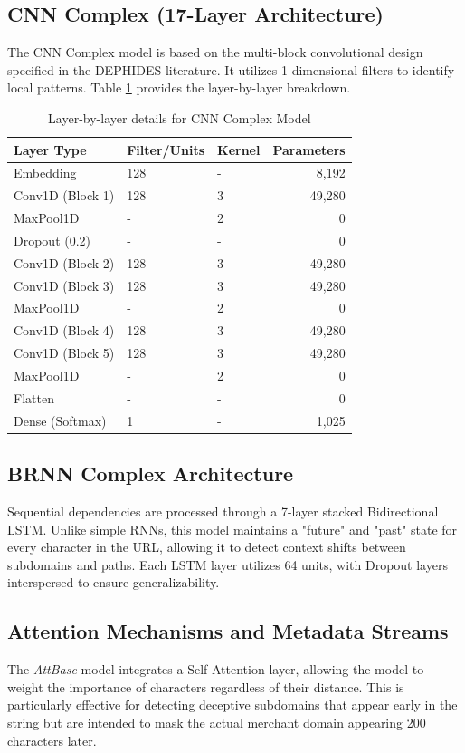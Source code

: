 \documentclass[journal,twocolumn]{IEEEtran}
\begin{document}
\subsection{CNN Complex (17-Layer Architecture)}
The CNN Complex model is based on the multi-block convolutional design specified in the DEPHIDES literature. It utilizes 1-dimensional filters to identify local patterns. Table \ref{tab:cnn_arch} provides the layer-by-layer breakdown.

\begin{table}[ht]
    \caption{Layer-by-layer details for CNN Complex Model}
    \label{tab:cnn_arch}
    \centering
    \begin{tabular}{l l l r}
    \toprule
    \textbf{Layer Type} & \textbf{Filter/Units} & \textbf{Kernel} & \textbf{Parameters} \\
    \midrule
    Embedding & 128 & - & 8,192 \\
    Conv1D (Block 1) & 128 & 3 & 49,280 \\
    MaxPool1D & - & 2 & 0 \\
    Dropout (0.2) & - & - & 0 \\
    Conv1D (Block 2) & 128 & 3 & 49,280 \\
    Conv1D (Block 3) & 128 & 3 & 49,280 \\
    MaxPool1D & - & 2 & 0 \\
    Conv1D (Block 4) & 128 & 3 & 49,280 \\
    Conv1D (Block 5) & 128 & 3 & 49,280 \\
    MaxPool1D & - & 2 & 0 \\
    Flatten & - & - & 0 \\
    Dense (Softmax) & 1 & - & 1,025 \\
    \bottomrule
    \end{tabular}
\end{table}

\subsection{BRNN Complex Architecture}
Sequential dependencies are processed through a 7-layer stacked Bidirectional LSTM. Unlike simple RNNs, this model maintains a "future" and "past" state for every character in the URL, allowing it to detect context shifts between subdomains and paths. Each LSTM layer utilizes 64 units, with Dropout layers interspersed to ensure generalizability.

\subsection{Attention Mechanisms and Metadata Streams}
The \textit{AttBase} model integrates a Self-Attention layer, allowing the model to weight the importance of characters regardless of their distance. This is particularly effective for detecting deceptive subdomains that appear early in the string but are intended to mask the actual merchant domain appearing 200 characters later.
\end{document}
